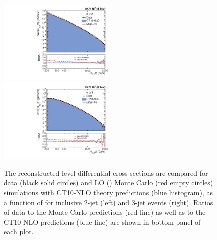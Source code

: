 \begin{figure}[!htbp]
 \begin{center}
 \hspace*{-5mm}\includegraphics[width=0.51\textwidth]{Plots_HT_2_150/Comparison_all_2_HT_2_150.pdf}%
 ~~\includegraphics[width=0.51\textwidth]{Plots_HT_2_150/Comparison_all_3_HT_2_150.pdf}
 \caption[Comparison of differential cross-sections for data with simulated events and CT10-NLO theory predictions.]{The reconstructed level differential cross-sections are compared for data (black solid circles) and LO \MadGraphFn\plusn \PYTHIAS (\MGP) Monte Carlo (red empty circles) simulations with CT10-NLO theory predictions (blue histogram), as a function of \httwo for inclusive 2-jet (left) and 3-jet events (right). Ratios of data to the Monte Carlo predictions (red line) as well as to the CT10-NLO predictions (blue line) are shown in bottom panel of each plot.}
 \label{fig:comp_all}
 \end{center}
\end{figure}

